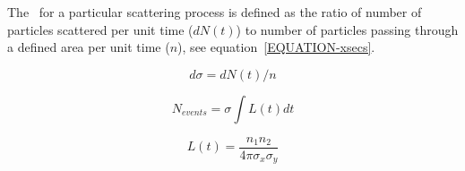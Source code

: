 




The \xs~for a particular scattering process is defined as the ratio of number of particles scattered per unit time ($dN(t)$) to number of particles passing through a defined area per unit time ($n$), see equation~\ref{EQUATION-xsecs}. 

\begin{equation}
d\sigma =dN(t)/n 
\label{EQUATION-xsecs}
\end{equation}

\begin{equation}
N_{events}=\sigma \int L(t) dt
\label{EQUATION-NEV}
\end{equation}

\begin{equation}
 L(t)= \frac{n_1 n_2}{4\pi \sigma_x \sigma_y} 
\label{EQUATION-LUMIN}
\end{equation}

